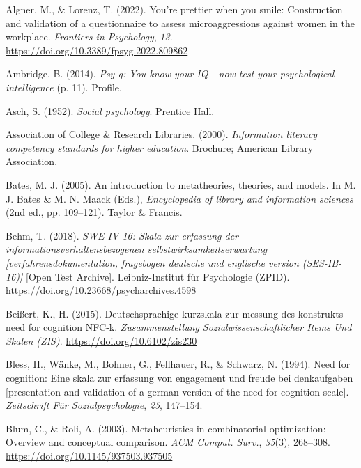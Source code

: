 \documentclass[
  12pt,
  a4paper,
  twoside]{article}
\newlength{\cslhangindent}
\newenvironment{CSLReferences}[2] %
 {\begin{list}{}{%
  \setlength{\itemindent}{0pt}
  \setlength{\leftmargin}{0pt}
  \setlength{\parsep}{0pt}
  \ifodd #1
   \setlength{\leftmargin}{\cslhangindent}
   \setlength{\itemindent}{-1\cslhangindent}
  \fi
  \setlength{\itemsep}{#2\baselineskip}}}
 {\end{list}}
\begin{document}
\label{refs}
\begin{CSLReferences}{1}{0}
Algner, M., \& Lorenz, T. (2022). You're prettier when you smile: Construction and validation of a questionnaire to assess microaggressions against women in the workplace. \emph{Frontiers in Psychology}, \emph{13}. \url{https://doi.org/10.3389/fpsyg.2022.809862}

Ambridge, B. (2014). \emph{Psy-q: You know your IQ - now test your psychological intelligence} (p. 11). Profile.

Asch, S. (1952). \emph{Social psychology}. Prentice Hall.

Association of College \& Research Libraries. (2000). \emph{Information literacy competency standards for higher education}. Brochure; American Library Association.

Bates, M. J. (2005). An introduction to metatheories, theories, and models. In M. J. Bates \& M. N. Maack (Eds.), \emph{Encyclopedia of library and information sciences} (2nd ed., pp. 109--121). Taylor \& Francis.

Behm, T. (2018). \emph{SWE-IV-16: Skala zur erfassung der informationsverhaltensbezogenen selbstwirksamkeitserwartung {[}verfahrensdokumentation, fragebogen deutsche und englische version (SES-IB-16){]}} {[}Open Test Archive{]}. Leibniz-Institut für Psychologie (ZPID). \url{https://doi.org/10.23668/psycharchives.4598}

Beißert, K., H. (2015). Deutschsprachige kurzskala zur messung des konstrukts need for cognition NFC-k. \emph{Zusammenstellung Sozialwissenschaftlicher Items Und Skalen (ZIS)}. \url{https://doi.org/10.6102/zis230}

Bless, H., Wänke, M., Bohner, G., Fellhauer, R., \& Schwarz, N. (1994). Need for cognition: Eine skala zur erfassung von engagement und freude bei denkaufgaben {[}presentation and validation of a german version of the need for cognition scale{]}. \emph{Zeitschrift Für Sozialpsychologie}, \emph{25}, 147--154.

Blum, C., \& Roli, A. (2003). Metaheuristics in combinatorial optimization: Overview and conceptual comparison. \emph{ACM Comput. Surv.}, \emph{35}(3), 268--308. \url{https://doi.org/10.1145/937503.937505}


\end{CSLReferences}
\end{document}
